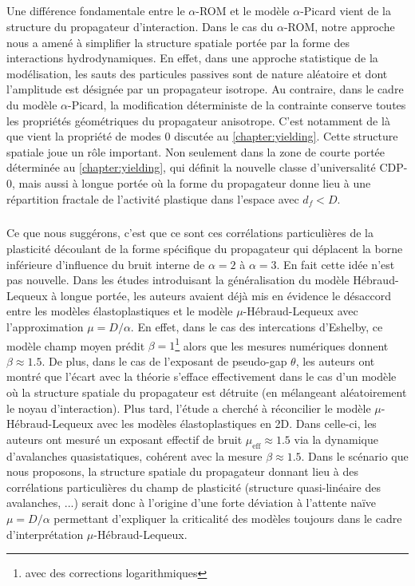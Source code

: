 \subparagraph{}Une différence fondamentale entre le $\alpha$-ROM et le modèle $\alpha$-Picard vient de la structure du propagateur d'interaction. Dans le cas du $\alpha$-ROM, notre approche nous a amené à simplifier la structure spatiale portée par la forme des interactions hydrodynamiques. En effet, dans une approche statistique de la modélisation, les sauts des particules passives sont de nature aléatoire et dont l'amplitude est désignée par un propagateur isotrope. Au contraire, dans le cadre du modèle $\alpha$-Picard, la modification déterministe de la contrainte conserve toutes les propriétés géométriques du propagateur anisotrope. C'est notamment de là que vient la propriété de modes 0 discutée au \autoref{chapter:yielding}. Cette structure spatiale joue un rôle important. Non seulement dans la zone de courte portée déterminée au \autoref{chapter:yielding}, qui définit la nouvelle classe d'universalité CDP-0, mais aussi à longue portée où la forme du propagateur donne lieu à une répartition fractale de l'activité plastique dans l'espace avec $d_f < D$.

\subparagraph{}Ce que nous suggérons, c'est que ce sont ces corrélations particulières de la plasticité découlant de la forme spécifique du propagateur qui déplacent la borne inférieure d’influence du bruit interne de $\alpha = 2$ à $\alpha = 3$. En fait cette idée n'est pas nouvelle. Dans les études \cite{lin_mean-field_2016, lin_microscopic_2018} introduisant la généralisation du modèle Hébraud-Lequeux à longue portée, les auteurs avaient déjà mis en évidence le désaccord entre les modèles élastoplastiques et le modèle $\mu$-Hébraud-Lequeux avec l'approximation $\mu = D/\alpha$. En effet, dans le cas des intercations d'Eshelby, ce modèle champ moyen prédit $\beta = 1$\footnote{avec des corrections logarithmiques} alors que les mesures numériques donnent $\beta \approx 1.5$. De plus, dans le cas de l'exposant de pseudo-gap $\theta$, les auteurs ont montré que l'écart avec la théorie s'efface effectivement dans le cas d'un modèle où la structure spatiale du propagateur est détruite (en mélangeant aléatoirement le noyau d'interaction). Plus tard, l'étude \cite{ferrero_criticality_2019} a cherché à réconcilier le modèle $\mu$-Hébraud-Lequeux avec les modèles élastoplastiques en 2D. Dans celle-ci, les auteurs ont mesuré un exposant effectif de bruit $\mu_\text{eff}\approx 1.5$ via la dynamique d'avalanches quasistatiques, cohérent avec la mesure $\beta \approx 1.5$. Dans le scénario que nous proposons, la structure spatiale du propagateur donnant lieu à des corrélations particulières du champ de plasticité (structure quasi-linéaire des avalanches, ...) serait donc à l'origine d'une forte déviation à l'attente naïve $\mu = D/\alpha$ permettant d'expliquer la criticalité des modèles toujours dans le cadre d'interprétation $\mu$-Hébraud-Lequeux.

